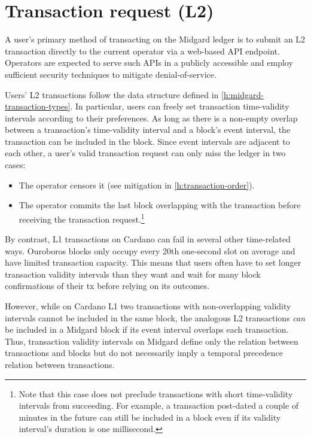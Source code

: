 \documentclass[../midgard.tex]{subfiles}
\begin{document}
\section{Transaction request (L2)}
\label{h:transaction-request}

A user's primary method of transacting on the Midgard ledger is to submit an L2 transaction directly to the current operator via a web-based API endpoint. Operators are expected to serve such APIs in a publicly accessible and employ sufficient security techniques to mitigate denial-of-service.

Users' L2 transactions follow the data structure defined in \cref{h:midgard-transaction-types}. In particular, users can freely set transaction time-validity intervals according to their preferences. As long as there is a non-empty overlap between a transaction's time-validity interval and a block's event interval, the transaction can be included in the block. Since event intervals are adjacent to each other, a user's valid transaction request can only miss the ledger in two cases:
\begin{itemize}
    \item The operator censors it (see mitigation in \cref{h:transaction-order}).
    \item The operator commits the last block overlapping with the transaction before receiving the transaction request.\footnote{Note that this case does not preclude transactions with short time-validity intervals from succeeding. For example, a transaction post-dated a couple of minutes in the future can still be included in a block even if its validity interval's duration is one millisecond.}
\end{itemize}

By contrast, L1 transactions on Cardano can fail in several other time-related ways. Ouroboros blocks only occupy every 20th one-second slot on average and have limited transaction capacity. This means that users often have to set longer transaction validity intervals than they want and wait for many block confirmations of their tx before relying on its outcomes.

However, while on Cardano L1 two transactions with non-overlapping validity intervals cannot be included in the same block, the analogous L2 transactions \emph{can} be included in a Midgard block if its event interval overlaps each transaction. Thus, transaction validity intervals on Midgard define only the relation between transactions and blocks but do not necessarily imply a temporal precedence relation between transactions.

\todo
\end{document}
